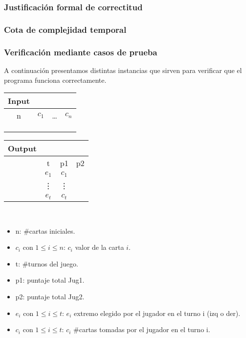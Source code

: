 \documentclass[11pt, a4paper, twoside]{article}
\begin{document}
\subsubsection{Justificación formal de correctitud}

\subsubsection{Cota de complejidad temporal}

\subsubsection{Verificación mediante casos de prueba}

A continuación presentamos distintas instancias que sirven para verificar que el programa funciona correctamente.\\

\begin{minipage}{0.4\textwidth}
		  \begin{tabular}{cccc}
			   Input \\
			   \hline
			   n & $c_1$ & \dots & $c_n$ \\
			   \\
			   \\
			   \\
		  \end{tabular}
\end{minipage} 
\begin{minipage}{0.3\textwidth}
		  \begin{tabular}{cccc}
			  Output\\
			  \hline
			  & t   & p1  & p2 \\
			  & $e_1$ & $c_1$  & \\
			  & \vdots & \vdots & \\
			  & $e_t$  & $c_t$ & 
		  \end{tabular}
\end{minipage} \\

\begin{itemize}
	\item n: \#cartas iniciales. 
	\item $c_i$ con $1 \le i \le n$: $c_i$ valor de la carta $i$. 
	\item t: \#turnos del juego. 
	\item p1: puntaje total Jug1.
	\item p2: puntaje total Jug2.
	\item $e_i$ con $1 \le i \le t$: $e_i$ extremo elegido por el jugador en el turno i (izq o der). 
	\item $c_i$ con $1 \le i \le t$: $c_i$ \#cartas tomadas por el jugador en el turno i. 	
\end{itemize}
				
\end{document}
